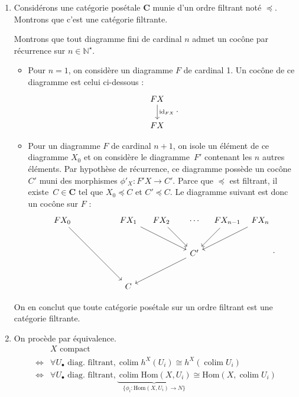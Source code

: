 \documentclass{../../td}
\newcommand\id{\ensuremath{\operatorname{id}}}
\newcommand\colim{\ensuremath{\operatorname{colim}}}
\begin{document}
  \begin{enumerate}
    \item Considérons une catégorie posétale $\mathbf{C}$ munie d'un ordre filtrant noté $\preceq$.
      Montrons que c'est une catégorie filtrante.

      Montrons que tout diagramme fini de cardinal $n$ admet un cocône par récurrence sur $n \in \mathds{N}^\star$.

      \begin{itemize}
        \item Pour $n = 1$, on considère un diagramme $F$ de cardinal 1.
          Un cocône de ce diagramme est celui ci-dessous :
          \[
          \begin{tikzcd}
            F X \arrow{d}{\id_{F X}}\\
            F X
          \end{tikzcd}
          .\] 
        \item Pour un diagramme $F$ de cardinal $n+1$, on isole un élément de ce diagramme $X_0$ et on considère le diagramme~$F'$ contenant les $n$ autres éléments.
          Par hypothèse de récurrence, ce diagramme possède un cocône $C'$ muni des morphismes $\phi'_X : F' X \to C'$.
          Parce que $\preceq$ est filtrant, il existe~$C \in \mathbf{C}$ tel que $X_0\preceq C$ et $C' \preceq C$.
          Le diagramme suivant est donc un cocône sur $F$ :
          \[
          \begin{tikzcd}[column sep={40,between origins}, row sep={40, between origins}]
            F X_0 \arrow{ddrr}{} & & F X_1 \arrow[swap]{drr}{} & F X_2 \arrow[swap]{dr}{} & \cdots  & F X_{n-1} \arrow[swap]{dl}{} & F X_n \arrow{dll}{}\\
                  &&&& C' \arrow{dll}{}\\
                  &&C
          \end{tikzcd}
          .\]
      \end{itemize}
      On en conclut que toute catégorie posétale sur un ordre filtrant est une catégorie filtrante.
    \item On procède par équivalence.
      \begin{align*}
        & \text{$X$ compact} \\
        \iff & \forall U_\bullet \text{ diag. filtrant}, \colim h^X(U_i) \cong h^X(\colim U_i)\\
        \iff & \forall U_\bullet \text{ diag. filtrant}, \underbrace{\colim \mathrm{Hom}(X, U_i)}_{\{\phi_i : \mathrm{Hom}(X, U_i) \to N\} } \cong \mathrm{Hom}(X, \colim U_i) \\

\end{align*}
\end{enumerate}
\end{document}
